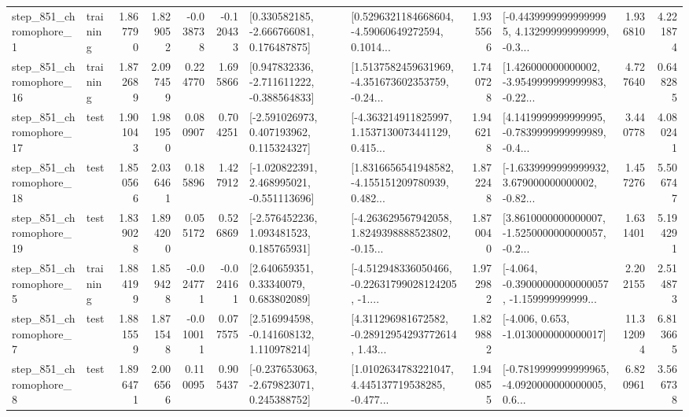 \begin{tabular}{llrrrrllrlrr}
   step\_851\_chromophore\_1 &  training &      1.867790 &    1.829052 &     -0.038738 & -0.120433 &    [0.330582185, -2.666766081, 0.176487875] &  [0.5296321184668604, -4.59060649272594, 0.1014... &       1.935566 &  [-0.44399999999999995, 4.132999999999999, -0.3... &            1.936810 &          4.221874 \\
  step\_851\_chromophore\_16 &  training &      1.872689 &    2.097459 &      0.224770 &  1.695866 &   [0.947832336, -2.711611222, -0.388564833] &  [1.5137582459631969, -4.351673602353759, -0.24... &       1.740728 &  [1.426000000000002, -3.9549999999999983, -0.22... &            4.727640 &          0.648285 \\
  step\_851\_chromophore\_17 &      test &      1.901043 &    1.981950 &      0.080907 &  0.704251 &    [-2.591026973, 0.407193962, 0.115324327] &  [-4.363214911825997, 1.1537130073441129, 0.415... &       1.946218 &  [4.1419999999999995, -0.7839999999999989, -0.4... &            3.440778 &          4.080241 \\
  step\_851\_chromophore\_18 &      test &      1.850566 &    2.036461 &      0.185896 &  1.427912 &   [-1.020822391, 2.468995021, -0.551113696] &  [1.8316656541948582, -4.155151209780939, 0.482... &       1.872248 &  [-1.6339999999999932, 3.679000000000002, -0.82... &            1.457276 &          5.506747 \\
  step\_851\_chromophore\_19 &      test &      1.839028 &    1.894200 &      0.055172 &  0.526869 &    [-2.576452236, 1.093481523, 0.185765931] &  [-4.263629567942058, 1.8249398888523802, -0.15... &       1.870040 &  [3.8610000000000007, -1.5250000000000057, -0.2... &            1.631401 &          5.194291 \\
   step\_851\_chromophore\_5 &  training &      1.884199 &    1.859428 &     -0.024771 & -0.024161 &      [2.640659351, 0.33340079, 0.683802089] &  [-4.512948336050466, -0.22631799028124205, -1.... &       1.972982 &  [-4.064, -0.39000000000000057, -1.159999999999... &            2.202155 &          2.514873 \\
   step\_851\_chromophore\_7 &      test &      1.881559 &    1.871548 &     -0.010011 &  0.077575 &    [2.516994598, -0.141608132, 1.110978214] &  [4.311296981672582, -0.28912954293772614, 1.43... &       1.829882 &               [-4.006, 0.653, -1.0130000000000017] &           11.312094 &          6.813665 \\
   step\_851\_chromophore\_8 &      test &      1.896471 &    2.006566 &      0.110095 &  0.905437 &   [-0.237653063, -2.679823071, 0.245388752] &  [1.0102634783221047, 4.445137719538285, -0.477... &       1.940855 &  [-0.7819999999999965, -4.0920000000000005, 0.6... &            6.820961 &          3.566738 \\

\end{tabular}
